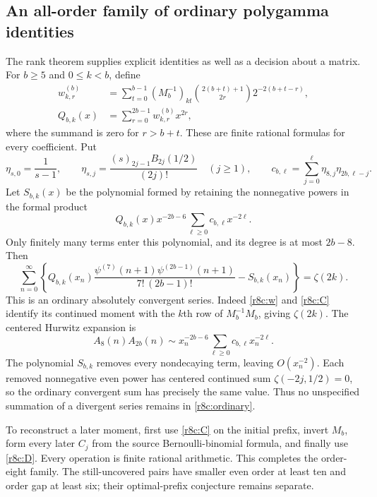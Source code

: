 \subsection{An all-order family of ordinary polygamma identities}

The rank theorem supplies explicit identities as well as a decision
about a matrix. For $b\ge5$ and $0\le k<b$, define
\begin{align}
 w_{k,r}^{(b)}&=
 \sum_{t=0}^{b-1}(M_b^{-1})_{kt}
 \binom{2(b+t)+1}{2r}2^{-2(b+t-r)},
 \label{r8c:w}\\
 Q_{b,k}(x)&=\sum_{r=0}^{2b-1}w_{k,r}^{(b)}x^{2r},
 \label{r8c:Q}
\end{align}
where the summand is zero for $r>b+t$. These are finite rational
formulas for every coefficient. Put
\[
 \eta_{s,0}=\frac1{s-1},\qquad
 \eta_{s,j}=\frac{(s)_{2j-1}B_{2j}(1/2)}{(2j)!}\quad(j\ge1),
 \qquad
 c_{b,\ell}=\sum_{j=0}^{\ell}\eta_{8,j}\eta_{2b,\ell-j}.
\]
Let $S_{b,k}(x)$ be the polynomial formed by retaining the
nonnegative powers in the formal product
\[
 Q_{b,k}(x)x^{-2b-6}\sum_{\ell\ge0}c_{b,\ell}x^{-2\ell}.
\]
Only finitely many terms enter this polynomial, and its degree is
at most $2b-8$. Then
\begin{equation}\label{r8c:ordinary}
 \boxed{\sum_{n=0}^{\infty}
 \left\{Q_{b,k}(x_n)
 \frac{\psi^{(7)}(n+1)\psi^{(2b-1)}(n+1)}{7!\,(2b-1)!}
       -S_{b,k}(x_n)\right\}=\zeta(2k).}
\end{equation}
This is an ordinary absolutely convergent series. Indeed
\eqref{r8c:w} and \eqref{r8c:C} identify its continued moment
with the $k$th row of $M_b^{-1}M_b$, giving $\zeta(2k)$.
The centered Hurwitz expansion is
\[
 A_8(n)A_{2b}(n)\sim x_n^{-2b-6}
                      \sum_{\ell\ge0}c_{b,\ell}x_n^{-2\ell}.
\]
The polynomial $S_{b,k}$ removes every nondecaying term, leaving
$O(x_n^{-2})$. Each removed nonnegative even power has centered
continued sum $\zeta(-2j,1/2)=0$, so the ordinary convergent sum
has precisely the same value. Thus no unspecified summation of a
divergent series remains in \eqref{r8c:ordinary}.

To reconstruct a later moment, first use \eqref{r8c:C} on the
initial prefix, invert $M_b$, form every later $C_j$ from the
source Bernoulli-binomial formula, and finally use \eqref{r8c:D}.
Every operation is finite rational arithmetic. This completes the
order-eight family. The still-uncovered pairs have smaller even order
at least ten and order gap at least six; their optimal-prefix
conjecture remains separate.
